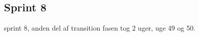 \documentclass[Main.tex]{subfiles}
\begin{document}
\subsection{Sprint 8}
sprint 8, anden del af transition fasen tog 2 uger, uge 49 og 50.
\end{document}
